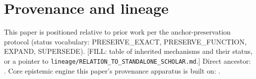 \documentclass[10pt,twocolumn]{article}
\begin{document}
\section{Provenance and lineage}
\label{sec:provenance}
This paper is positioned relative to prior work per the anchor-preservation
protocol (status vocabulary: \textsc{PRESERVE\_EXACT}, \textsc{PRESERVE\_FUNCTION},
\textsc{EXPAND}, \textsc{SUPERSEDE}). [FILL: table of inherited mechanisms and
their status, or a pointer to \texttt{lineage/RELATION\_TO\_STANDALONE\_SCHOLAR.md}.]
Direct ancestor: \citet{lahtee2026standalone}. Core epistemic engine this
paper's provenance apparatus is built on: \citet{lahtee2026readoutcondition}.

\balance


\end{document}
